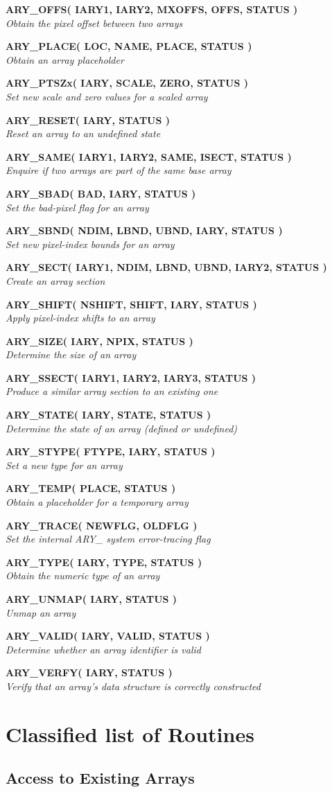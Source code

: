 \documentclass[twoside,11pt]{article}
\newcommand{\xlabel}[1]{}
\newcommand{\noteroutine}[2]{\textbf{#1}\hspace*{\fill}\nopagebreak \\
                             \hspace*{3em}\emph{#2}\hspace*{\fill}\par}
\begin{document}
\noteroutine{ARY\_OFFS( IARY1, IARY2, MXOFFS, OFFS, STATUS )}
            {Obtain the pixel offset between two arrays}
\noteroutine{ARY\_PLACE( LOC, NAME, PLACE, STATUS )}
            {Obtain an array placeholder}
\noteroutine{ARY\_PTSZx( IARY, SCALE, ZERO, STATUS )}
            {Set new scale and zero values for a scaled array}
\noteroutine{ARY\_RESET( IARY, STATUS )}
            {Reset an array to an undefined state}
\noteroutine{ARY\_SAME( IARY1, IARY2, SAME, ISECT, STATUS )}
            {Enquire if two arrays are part of the same base array}
\noteroutine{ARY\_SBAD( BAD, IARY, STATUS )}
            {Set the bad-pixel flag for an array}
\noteroutine{ARY\_SBND( NDIM, LBND, UBND, IARY, STATUS )}
            {Set new pixel-index bounds for an array}
\noteroutine{ARY\_SECT( IARY1, NDIM, LBND, UBND, IARY2, STATUS )}
            {Create an array section}
\noteroutine{ARY\_SHIFT( NSHIFT, SHIFT, IARY, STATUS )}
            {Apply pixel-index shifts to an array}
\noteroutine{ARY\_SIZE( IARY, NPIX, STATUS )}
            {Determine the size of an array}
\noteroutine{ARY\_SSECT( IARY1, IARY2, IARY3, STATUS )}
            {Produce a similar array section to an existing one}
\noteroutine{ARY\_STATE( IARY, STATE, STATUS )}
            {Determine the state of an array (defined or undefined)}
\noteroutine{ARY\_STYPE( FTYPE, IARY, STATUS )}
            {Set a new type for an array}
\noteroutine{ARY\_TEMP( PLACE, STATUS )}
            {Obtain a placeholder for a temporary array}
\noteroutine{ARY\_TRACE( NEWFLG, OLDFLG )}
            {Set the internal ARY\_ system error-tracing flag}
\noteroutine{ARY\_TYPE( IARY, TYPE, STATUS )}
            {Obtain the numeric type of an array}
\noteroutine{ARY\_UNMAP( IARY, STATUS )}
            {Unmap an array}
\noteroutine{ARY\_VALID( IARY, VALID, STATUS )}
            {Determine whether an array identifier is valid}
\noteroutine{ARY\_VERFY( IARY, STATUS )}
            {Verify that an array's data structure is correctly constructed}


\newpage
\section{\xlabel{classified_list_of_routines}Classified list of Routines}
\label{classified_list_of_routines}


\subsection{\xlabel{access_to_existing_arrays}Access to Existing Arrays}
\label{access_to_existing_arrays}
\end{document}

